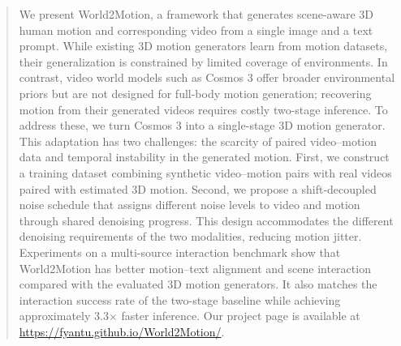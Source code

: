 \documentclass{article} %
\begin{document}
\begin{abstract}
We present World2Motion, a framework that generates scene-aware 3D human motion and corresponding video from a single image and a text prompt. While existing 3D motion generators learn from motion datasets, their generalization is constrained by limited coverage of environments. In contrast, video world models such as Cosmos 3 offer broader environmental priors but are not designed for full-body motion generation; recovering motion from their generated videos requires costly two-stage inference. To address these, we turn Cosmos 3 into a single-stage 3D motion generator. This adaptation has two challenges: the scarcity of paired video--motion data and temporal instability in the generated motion. First, we construct a training dataset combining synthetic video--motion pairs with real videos paired with estimated 3D motion. Second, we propose a shift-decoupled noise schedule that assigns different noise levels to video and motion through shared denoising progress. This design accommodates the different denoising requirements of the two modalities, reducing motion jitter. Experiments on a multi-source interaction benchmark show that World2Motion has better motion--text alignment and scene interaction compared with the evaluated 3D motion generators. It also matches the interaction success rate of the two-stage baseline while achieving approximately 3.3$\times$ faster inference. Our project page is available at \url{https://fyantu.github.io/World2Motion/}. 


\end{abstract}







\end{document}
